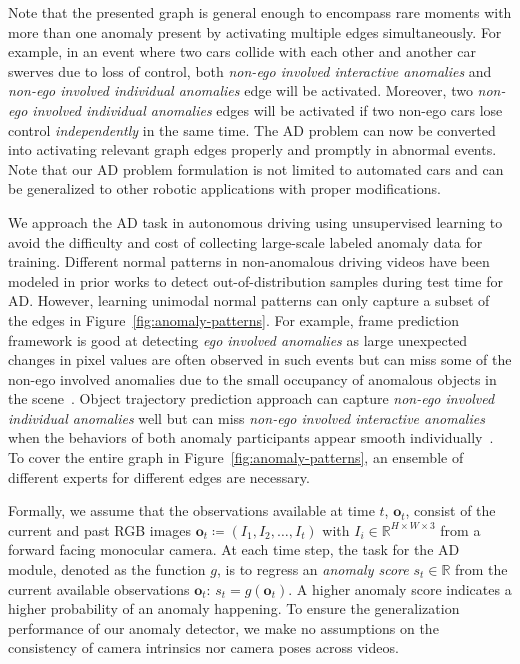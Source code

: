 Note that the presented graph is general enough to encompass rare moments with more than one anomaly present by activating multiple edges simultaneously. For example, in an event where two cars collide with each other and another car swerves due to loss of control, both \textit{non-ego involved interactive anomalies} and \textit{non-ego involved individual anomalies} edge will be activated. Moreover, two \textit{non-ego involved individual anomalies} edges will be activated if two non-ego cars lose control \textit{independently} in the same time. The AD problem can now be converted into activating relevant graph edges properly and promptly in abnormal events. Note that our AD problem formulation is not limited to automated cars and can be generalized to other robotic applications with proper modifications.

We approach the AD task in autonomous driving using unsupervised learning to avoid the difficulty and cost of collecting large-scale labeled anomaly data for training. Different normal patterns in non-anomalous driving videos have been modeled in prior works to detect out-of-distribution samples during test time for AD. However, learning unimodal normal patterns can only capture a subset of the edges in Figure~\ref{fig:anomaly-patterns}. For example, frame prediction framework is good at detecting \textit{ego involved anomalies} as large unexpected changes in pixel values are often observed in such events but can miss some of the non-ego involved anomalies due to the small occupancy of anomalous objects in the scene~\citep{liu2018future,hasan2016learning}. Object trajectory prediction approach can capture \textit{non-ego involved individual anomalies} well but can miss \textit{non-ego involved interactive anomalies} when the behaviors of both anomaly participants appear smooth individually~\citep{yao2019unsupervised,yao2022dota}. To cover the entire graph in Figure~\ref{fig:anomaly-patterns}, an ensemble of different experts for different edges are necessary.

Formally, we assume that the observations available at time $t$, $\mathbf{o}_t$, consist of the current and past RGB images $\mathbf{o}_t \coloneqq \left( I_1, I_2, \dots, I_t \right)$ with $I_i \in \mathbb{R}^{H \times W \times 3}$ from a forward facing monocular camera. At each time step, the task for the AD module, denoted as the function $g$, is to regress an \textit{anomaly score} $s_t \in \mathbb{R}$ from the current available observations $\mathbf{o}_t$: $s_t = g(\mathbf{o}_t)$. A higher anomaly score indicates a higher probability of an anomaly happening. To ensure the generalization performance of our anomaly detector, we make no assumptions on the consistency of camera intrinsics nor camera poses across videos.

